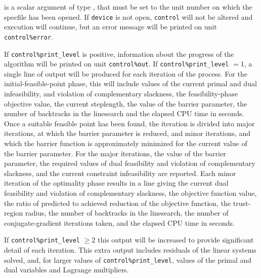 \documentclass{galahad}
\begin{document}
\begin{description}

 is a scalar \intentin argument of type \integer,
that must be set to the unit number on which the specfile
has been opened. If {\tt device} is not open, {\tt control} will
not be altered and execution will continue, but an error message
will be printed on unit {\tt control\%error}.

\end{description}


\galinfo
If {\tt control\%print\_level} is positive, information about the progress 
of the algorithm will be printed on unit {\tt control\-\%out}.
If {\tt control\%print\_level} $= 1$, a single line of output will be produced 
for each iteration of the process. 
For the initial-feasible-point phase,
this will include values of the current primal and dual infeasibility, and
violation of complementary slackness, the feasibility-phase objective value,
the current steplength, the value of the barrier parameter, the
number of backtracks in the linesearch and the elapsed CPU time in seconds.
Once a suitable feasible point has been found, the iteration is divided
into major iterations, at which the barrier parameter is reduced, and
minor iterations, and which the barrier function is approximately minimized
for the current value of the barrier parameter. For the major iterations,
the value of the barrier parameter, the required values of 
dual feasibility and violation of complementary slackness, and the current
constraint infeasibility are reported. Each minor iteration of the
optimality phase results in a line giving 
the current dual feasibility and violation of complementary slackness, the
objective function value, the ratio of predicted to achieved reduction 
of the objective function, the trust-region radius, the 
number of backtracks in the linesearch, the number of conjugate-gradient 
iterations taken, and the elapsed CPU time in seconds. 

If {\tt control\%print\_level} $\geq 2$ this 
output will be increased to provide significant detail of each iteration. 
This extra output includes residuals of the linear systems solved, and,
for larger values of {\tt control\%print\_level}, values of the primal and dual
variables and Lagrange multipliers. 

\end{document}
